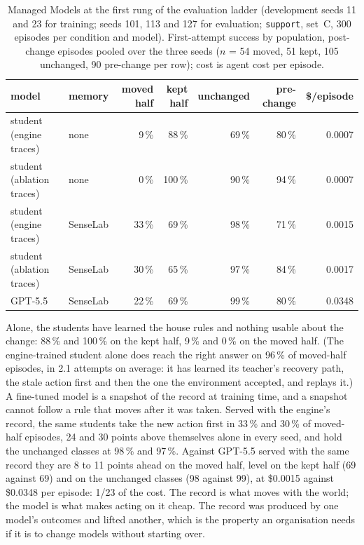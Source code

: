 \documentclass[11pt]{article}
\newcommand{\code}[1]{\texttt{#1}}
\begin{document}
\begin{table}[t]
\centering\footnotesize
\caption{Managed Models at the first rung of the evaluation ladder (development seeds 11 and 23
for training; seeds 101, 113 and 127 for evaluation; \code{support}, set~C, 300 episodes per
condition and model). First-attempt success by population, post-change episodes pooled over the
three seeds ($n$ = 54 moved, 51 kept, 105 unchanged, 90 pre-change per row); cost is agent cost
per episode.}
\label{tab:student}
\setlength{\tabcolsep}{4pt}
\begin{tabular}{@{}llrrrrr@{}}
\toprule
model & memory & moved half & kept half & unchanged & pre-change & \$/episode\\
\midrule
student (engine traces)   & none     & 9\,\%  & 88\,\%  & 69\,\% & 80\,\% & 0.0007\\
student (ablation traces) & none     & 0\,\%  & 100\,\% & 90\,\% & 94\,\% & 0.0007\\
student (engine traces)   & SenseLab & 33\,\% & 69\,\%  & 98\,\% & 71\,\% & 0.0015\\
student (ablation traces) & SenseLab & 30\,\% & 65\,\%  & 97\,\% & 84\,\% & 0.0017\\
GPT-5.5                   & SenseLab & 22\,\% & 69\,\%  & 99\,\% & 80\,\% & 0.0348\\
\bottomrule
\end{tabular}
\end{table}

Alone, the students have learned the house rules and nothing usable about the change: 88\,\%
and 100\,\% on the kept half, 9\,\% and 0\,\% on the moved half. (The engine-trained student
alone does reach the right answer on 96\,\% of moved-half episodes, in 2.1 attempts on average:
it has learned its teacher's recovery path, the stale action first and then the one the
environment accepted, and replays it.) A fine-tuned model is a snapshot of the record at
training time, and a snapshot cannot follow a rule that moves after it was taken. Served with
the engine's record, the same students take the new action first in 33\,\% and 30\,\% of
moved-half episodes, 24 and 30 points above themselves alone in every seed, and hold the
unchanged classes at 98\,\% and 97\,\%. Against GPT-5.5 served with the same record they are
8 to 11 points ahead on the moved half, level on the kept half (69 against 69) and on the
unchanged classes (98 against 99), at \$0.0015 against \$0.0348 per episode: 1/23 of the cost. The record
is what moves with the world; the model is what makes acting on it cheap. The record was produced
by one model's outcomes and lifted another, which is the property an organisation needs if it is
to change models without starting over.
\end{document}

